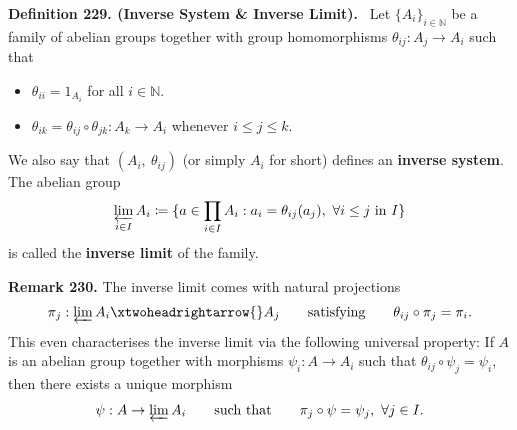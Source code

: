 \documentclass[12pt,a4paper,footinclude=true,headinclude=true]{scrbook} %
\newenvironment{definition}[2][Definition]
    { \begin{mdframed}[backgroundcolor=gray!20] \textbf{#1 #2.}\ }
    {  \end{mdframed}}
\newenvironment{remark}[2][Remark]
    { \begin{mdframed}[backgroundcolor=gray!20] \textbf{#1 #2.} }
    {  \end{mdframed}}
\begin{document}
\begin{definition}{229. (Inverse System \& Inverse Limit)}
    \newline Let $\{A_i\}_{i\in\mathbb{N}}$ be a family of abelian groups together with group homomorphisms $\theta_{ij}:A_j\to A_i$ such that
    \begin{itemize}
        \item $\theta_{ii}=1_{A_i}$ for all $i\in\mathbb{N}$.
        \item $\theta_{ik}=\theta_{ij}\circ\theta_{jk}:A_k\to A_i$ whenever $i\leq j\leq k$.
    \end{itemize}
    We also say that $(A_i,\ \theta_{ij})$ (or simply $A_i$ for short) defines an \textbf{inverse system}. The abelian group
    \begin{align*}
        \varprojlim_{i\in I}A_i\coloneqq\{a\in\prod_{i\in I}A_i:a_i=\theta_{ij}(a_j),\ \forall i\leq j\ \text{in}\ I\}
    \end{align*}
    is called the \textbf{inverse limit} of the family.
\end{definition}

\begin{remark}{230}
    The inverse limit comes with natural projections
    \begin{align*}
        \pi_j:\varprojlim A_i\xtwoheadrightarrow{} A_j \qquad\text{satisfying}\qquad \theta_{ij}\circ\pi_j=\pi_i.
    \end{align*}
    This even characterises the inverse limit via the following universal property: If $A$ is an abelian group together with morphisms $\psi_i:A\to A_i$ such that $\theta_{ij}\circ\psi_j=\psi_i$, then there exists a unique morphism 
    \begin{align*}
        \psi:A\to\varprojlim A_i\qquad\text{such that}\qquad \pi_j\circ\psi=\psi_j,\ \forall j\in I.
    \end{align*}
    \begin{center}
    \end{center}
\end{remark}
\end{document}
